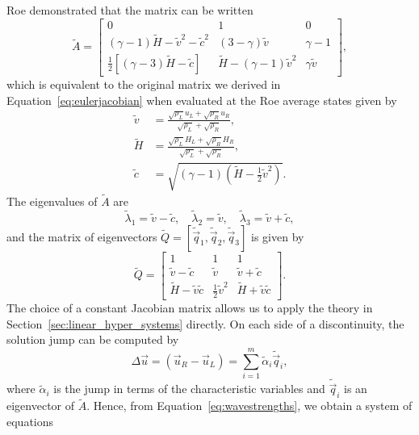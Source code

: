 Roe demonstrated that the matrix can be written
\begin{equation}
	\tilde A = 
	\begin{bmatrix}
		0 & 1 & 0 \\ 
		(\gamma-1)\tilde H - \tilde v^2-\tilde c^2 & (3-\gamma)\tilde v & \gamma-1 \\
		\frac{1}{2}\left[(\gamma-3)\tilde H - \tilde c\right] & \tilde H - (\gamma-1)\tilde v^2 & \gamma \tilde v
	\end{bmatrix},
\end{equation}
which is equivalent to the original matrix we derived in Equation~\ref{eq:eulerjacobian} when evaluated at the Roe average states given by 
\begin{align}
	\tilde v &= \frac{\sqrt{\rho_L} u_L + \sqrt{\rho_R} u_R}{\sqrt{\rho_L} + \sqrt{\rho_R}},\\
	\tilde H &= \frac{\sqrt{\rho_L} H_L + \sqrt{\rho_R} H_R}{\sqrt{\rho_L} + \sqrt{\rho_R}},\\
	\tilde c &= \sqrt{(\gamma-1)(\tilde H - \frac{1}{2} \tilde v^2)}.
\end{align}
The eigenvalues of $\tilde A$ are
\begin{equation}
	\tilde\lambda_1 = \tilde v - \tilde c,\quad \tilde\lambda_2 = \tilde v,\quad\tilde\lambda_3 = \tilde v + \tilde c,
\end{equation}
and the matrix of eigenvectors $\tilde Q=[\tilde{\vec q}_1, \tilde{\vec q}_2, \tilde{\vec q}_3]$ is given by
\begin{equation}
	\tilde Q = 
	\begin{bmatrix}
	1 & 1 & 1 \\ 
	\tilde v - \tilde c & \tilde v & \tilde v + \tilde c \\ 
	\tilde H - \tilde v \tilde c & \frac{1}{2} \tilde v^2 & \tilde H + \tilde v \tilde c
	\end{bmatrix}.
\end{equation}
The choice of a constant Jacobian matrix allows us to apply the theory in Section~\ref{sec:linear_hyper_systems} directly. On each side of a discontinuity, the solution jump can be computed by
\begin{equation}
	\Delta \vec u = \left(\vec u_R - \vec u_L\right) = \sum_{i=1}^m \tilde \alpha_i \tilde{\vec q}_i,
	\label{eq:wavestrengths}
\end{equation}
where $\tilde \alpha_i$ is the jump in terms of the characteristic variables and $\tilde{\vec q}_i$ is an eigenvector of $\tilde A$. Hence, from Equation~\ref{eq:wavestrengths}, we obtain a system of equations 
